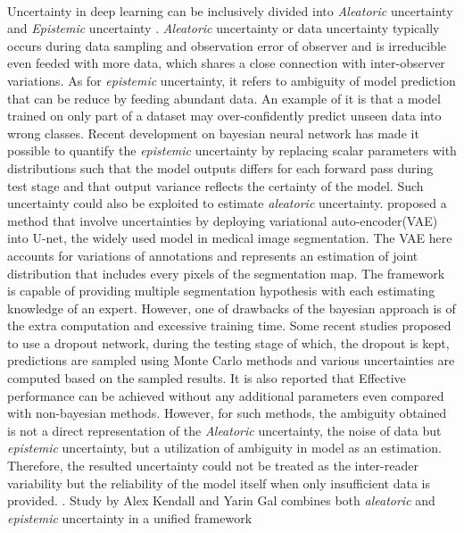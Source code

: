 \documentclass[12pt]{extarticle}
\begin{document}
\paragraph{}
Uncertainty in deep learning can be inclusively divided into \textit{Aleatoric}
uncertainty and \textit{Epistemic} uncertainty \cite{kendall2017uncertainties}.
\textit{Aleatoric} uncertainty or data uncertainty typically occurs during data sampling and
observation error of observer and is irreducible even feeded with more data, which shares a
close connection with inter-observer variations. As for \textit{epistemic}
uncertainty, it refers to ambiguity of model prediction that can be reduce by feeding abundant data.
An example of it is that a model trained on only part of a dataset may over-confidently
predict unseen data into wrong classes. Recent development on bayesian neural network has made it possible
to quantify the \textit{epistemic} uncertainty by replacing scalar parameters with distributions such that 
the model outputs differs for each forward pass during test stage and that output variance reflects the 
certainty of the model. Such uncertainty could also be exploited to estimate \textit{aleatoric} uncertainty.
\cite{kohl2019probabilistic} proposed a method that involve uncertainties by
deploying variational auto-encoder(VAE) into U-net, the widely used model in medical image segmentation. 
The VAE here accounts for variations of annotations and represents an estimation of joint distribution that 
includes every pixels of the segmentation map. The framework is capable of providing multiple segmentation 
hypothesis with each estimating knowledge of an expert.
However, one of drawbacks of the bayesian approach is of the extra computation
and excessive training time. Some recent studies proposed to use a dropout network,
during the testing stage of which, the dropout is kept, predictions are sampled
using Monte Carlo methods and various uncertainties are computed based on the sampled results.
It is also reported that Effective performance can be achieved without any additional parameters even 
compared with non-bayesian methods. However, for such methods, the ambiguity obtained is
not a direct representation of the \textit{Aleatoric} uncertainty,
the noise of data but \textit{epistemic} uncertainty, but a utilization of ambiguity in model
\cite{kendall2017uncertainties} as an estimation. Therefore, the resulted uncertainty could not
be treated as the inter-reader variability but the reliability of 
the model itself when only insufficient data is provided. 
\cite{nair2018exploring}. Study by Alex Kendall and Yarin Gal \cite{kendall2017uncertainties} 
combines both \textit{aleatoric} and \textit{epistemic} uncertainty in a unified framework 
\end{document}
